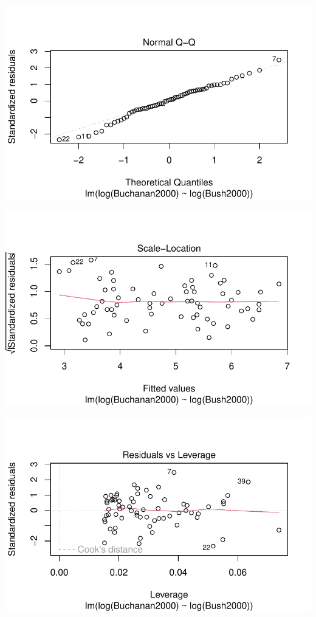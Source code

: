 \documentclass[
  letterpaper,
  DIV=11,
  numbers=noendperiod]{scrartcl}
\begin{document}
\includegraphics{case_study_1_files/figure-pdf/unnamed-chunk-6-15.pdf}

\includegraphics{case_study_1_files/figure-pdf/unnamed-chunk-6-16.pdf}

\includegraphics{case_study_1_files/figure-pdf/unnamed-chunk-6-17.pdf}
\end{document}
